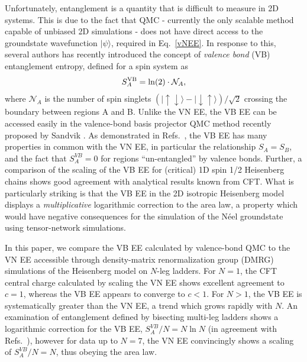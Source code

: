 \documentclass[prl,aps,twocolumn,floatfix,amsmath,amssymb,superscriptaddress,tightenlines]{revtex4}
\begin{document}
Unfortunately, entanglement is a quantity that is difficult to
measure in 2D systems.  This is due to the fact that QMC - currently the
only scalable method capable of unbiased 2D simulations - does not have
direct access to the groundstate wavefunction $| \psi \rangle$, required
in Eq.~\eqref{vNEE}.  In response to this, several authors \cite{Alet,
Chh} has recently introduced the concept of {\it valence bond} (VB)
entanglement entropy, defined for a  spin system as
\begin{equation} 
S^{\rm VB}_A = \ln(2) \cdot \mathcal{N}_A, \label{VBEE}
\end{equation} 
where $ \mathcal{N}_A$ is the number of spin singlets
${( |\uparrow \downarrow \rangle - | \downarrow \uparrow
\rangle)/\sqrt{2}}$ crossing the boundary between regions A and B.  Unlike
the VN EE, the VB EE can be accessed easily in the valence-bond basis
projector QMC method recently proposed by Sandvik \cite{Sandvik}.  As
demonstrated in Refs.~\cite{Alet,Chh}, the VB EE has many properties in
common with the VN EE, in particular the relationship $S_A = S_B$, and the
fact that $S^{VB}_A=0$ for regions ``un-entangled'' by valence bonds.
Further, a comparison of the scaling of the VB EE for (critical) 1D spin
1/2 Heisenberg chains shows good agreement with analytical results known
from CFT.  What is
particularly striking \cite{Alet,Chh} is that the VB EE in the
 2D isotropic Heisenberg model
displays a {\it multiplicative} logarithmic correction to the area law, a property
which would have negative consequences for the simulation of the 
N\'eel groundstate using tensor-network simulations.

 
In this paper, we compare the VB EE calculated by valence-bond QMC to the
VN EE accessible through density-matrix renormalization group
(DMRG) simulations of the Heisenberg model on $N$-leg ladders.    For $N=1$, the CFT central charge calculated  by scaling the
VN EE shows excellent agreement to $c=1$, whereas the VB EE appears to converge
to $c<1$.
For $N>1$, the VB EE is systematically greater than the VN EE,
a trend which grows rapidly with $N$. An
examination of entanglement defined by bisecting multi-leg ladders
shows a logarithmic correction for the VB EE, $S^{VB}_A /N = N \ln
N$ (in agreement with Refs.~\cite{Alet,Chh}), however for data up to
$N=7$, the VN EE convincingly shows a scaling of
$S^{VB}_A /N = N$, thus obeying the area law.
\end{document}
